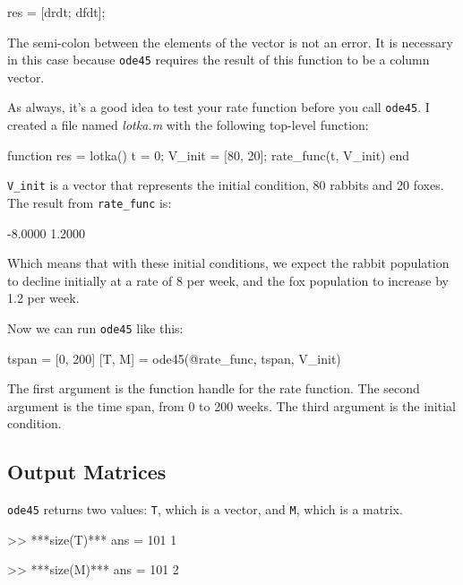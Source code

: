 \begin{code}
    res = [drdt; dfdt];
\end{code}

The semi-colon between the elements of the vector is not an error.  It
is necessary in this case because {\tt ode45} requires the result of
this function to be a column vector.


As always, it's a good idea to test your rate function before you call {\tt ode45}.  
I created a file named {\em lotka.m} with the following top-level function:

\begin{code}
function res = lotka()
    t = 0;
    V_init = [80, 20];
    rate_func(t, V_init)
end
\end{code}


\verb"V_init" is a vector that represents the initial condition, 80 rabbits and 20 foxes.  
The result from \verb"rate_func" is:

\begin{code}
-8.0000
 1.2000
 \end{code}
  
Which means that with these initial conditions, we expect the rabbit population to decline initially at a rate of 8 per week, and the fox population to increase by 1.2 per week.  
  
Now we can run {\tt ode45} like this:

\begin{code}
tspan = [0, 200]
[T, M] = ode45(@rate_func, tspan, V_init)
\end{code}

The first argument is the function handle for the rate function.
The second argument is the time span, from 0 to 200 weeks.
The third argument is the initial condition.



\subsection{Output Matrices}

{\tt ode45} returns two values: {\tt T}, which is a vector, 
and {\tt M}, which is a matrix.

\begin{code}
>> ***size(T)***
ans = 101     1

>> ***size(M)***
ans = 101     2
\end{code}

